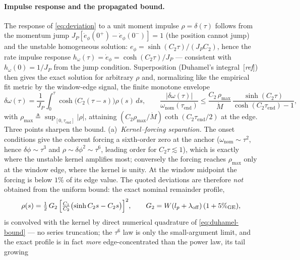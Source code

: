 \paragraph{Impulse response and the propagated bound.}
The response of \eqref{eq:deviation} to a unit moment impulse
$\rho=\delta(\tau)$ follows from the momentum jump
$J_P[\dot e_\phi(0^+)-\dot e_\phi(0^-)]=1$ (the position cannot jump)
and the unstable homogeneous solution:
$e_\phi = \sinh(C_2\tau)/(J_P C_2)$, hence the rate impulse response
$h_\omega(\tau) = \dot e_\phi = \cosh(C_2\tau)/J_P$ — consistent with
$h_\omega(0)=1/J_P$ from the jump condition. Superposition (Duhamel's
integral~[\emph{ref}]) then gives the exact solution for arbitrary
$\rho$ and, normalizing like the empirical fit metric by the
window-edge signal, the finite monotone envelope
\begin{equation}
  \delta\omega(\tau)
  = \frac{1}{J_P}\!\int_0^{\tau}\!\!\cosh\bigl(C_2(\tau{-}s)\bigr)\rho(s)\,ds,
  \qquad
  \frac{|\delta\omega(\tau)|}{\omega_{\mathrm{nom}}(\tau_{\mathrm{end}})}
  \le \frac{C_2\,\rho_{\max}}{\dot M}\,
      \frac{\sinh(C_2\tau)}{\cosh(C_2\tau_{\mathrm{end}})-1},
  \label{eq:duhamel-bound}
\end{equation}
with $\rho_{\max} \triangleq \sup_{[0,\tau_{\mathrm{end}}]}|\rho|$,
attaining $(C_2\rho_{\max}/\dot M)\coth(C_2\tau_{\mathrm{end}}/2)$ at
the edge. Three points sharpen the bound.
(a)~\emph{Kernel--forcing separation.} The onset conditions give the
coherent forcing a sixth-order zero at the anchor
($\omega_{\mathrm{nom}} \sim \tau^2$, hence
$\delta\phi \sim \tau^3$ and $\rho \sim \delta\phi^2 \sim \tau^6$,
leading order for $C_2\tau \lesssim 1$), which is exactly where the
unstable kernel amplifies most; conversely the forcing reaches
$\rho_{\max}$ only at the window edge, where the kernel is unity. At
the window midpoint the forcing is below $1\%$ of its edge value.
The quoted deviations are therefore \emph{not} obtained from the
uniform bound: the exact nominal remainder profile,
\begin{equation}
  \rho(s) = \tfrac12\,G_2\,
  \Bigl[\tfrac{C_1}{C_2}\bigl(\sinh C_2 s - C_2 s\bigr)\Bigr]^2,
  \qquad
  G_2 = W(l_p+\lambda_{\mathrm{off}})\,(1+5\%_{\mathrm{GE}}),
  \label{eq:rho-profile}
\end{equation}
is convolved with the kernel by direct numerical quadrature of
\eqref{eq:duhamel-bound} — no series truncation; the $\tau^6$ law is
only the small-argument limit, and the exact profile is in fact
\emph{more} edge-concentrated than the power law, its tail growing
